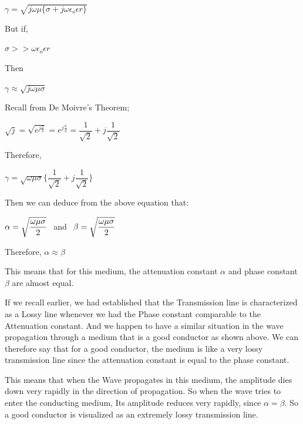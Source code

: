 \begin{center}
$\gamma=\sqrt{j\omega\mu\{\sigma+j\omega\epsilon_{o}\epsilon{r}\}}$	
\end{center}

But if, 
\begin{center}
$\sigma>>\omega\epsilon_{o}\epsilon{r}$
\end{center}

Then

$\gamma\approx\sqrt{j\omega\mu\sigma}$

Recall from De Moivre's Theorem;	

\begin{center}
$\sqrt{j}=\sqrt{e^{j\frac{\pi}{2}}}=e^{j\frac{\pi}{4}}=\dfrac{1}{\sqrt{2}}+j\dfrac{1}{\sqrt{2}}$
\end{center}

Therefore,

\begin{center}		
$\gamma = \sqrt{\omega\mu\sigma}\{\dfrac{1}{\sqrt{2}}+j\dfrac{1}{\sqrt{2}}\}$

\end{center}

Then we can deduce from the above equation that:

\begin{center}

$\alpha=\sqrt{\dfrac{\omega\mu\sigma}{2}}\hspace{0.15cm}$ and $\hspace{0.15cm}\beta=\sqrt{\dfrac{\omega\mu\sigma}{2}}$

\end{center}

Therefore,
$\alpha\approx\beta$

This means that for this medium, the attenuation constant $\alpha$ and phase constant $\beta$ are almost equal.

If we recall earlier, we had established that the Transmission line is characterized as a Lossy line whenever we had the Phase constant comparable to the Attenuation constant. And we happen to have a similar situation in the wave propagation through a medium that is a good conductor as shown above. We can therefore say that for a good conductor, the medium is like a very lossy transmission line since the attenuation constant is equal to the phase constant.

This means that when the Wave propagates in this medium, the amplitude dies down very rapidly in the direction of propagation. So when the wave tries to enter the conducting medium, Its amplitude reduces very rapidly, since $\alpha=\beta$. So a good conductor is visualized as an extremely lossy transmission line.

